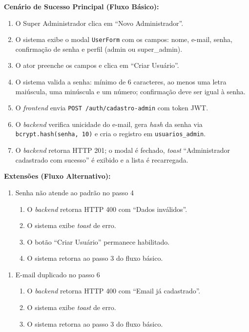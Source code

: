 \textbf{Cenário de Sucesso Principal (Fluxo Básico):}
\begin{enumerate}
  \item O Super Administrador clica em
        ``Novo Administrador''.
  \item O sistema exibe o modal \texttt{UserForm} com
        os campos: nome, e-mail, senha, confirmação de
        senha e perfil (admin ou super\_admin).
  \item O ator preenche os campos e clica em ``Criar Usuário''.
  \item O sistema valida a senha: mínimo de 6 caracteres,
        ao menos uma letra maiúscula, uma minúscula e um
        número; confirmação deve ser igual à senha.
  \item O \textit{frontend} envia
        \texttt{POST /auth/cadastro-admin} com token JWT.
  \item O \textit{backend} verifica unicidade do e-mail,
        gera \textit{hash} da senha via
        \texttt{bcrypt.hash(senha, 10)} e cria o registro
        em \texttt{usuarios\_admin}.
  \item O \textit{backend} retorna HTTP 201; o modal é
        fechado, \textit{toast} ``Administrador cadastrado
        com sucesso'' é exibido e a lista é recarregada.
\end{enumerate}

\textbf{Extensões (Fluxo Alternativo):}

\begin{enumerate}
  \renewcommand{\theenumi}{4a}
  \renewcommand{\labelenumi}{\theenumi.}
  \item Senha não atende ao padrão no passo 4
  \begin{enumerate}
  \item O \textit{backend} retorna HTTP 400 com
        ``Dados inválidos''.
  \item O sistema exibe \textit{toast} de erro.
  \item O botão ``Criar Usuário'' permanece habilitado.
  \item O sistema retorna ao passo 3 do fluxo básico.
  \end{enumerate}
\end{enumerate}

\begin{enumerate}
  \renewcommand{\theenumi}{6a}
  \renewcommand{\labelenumi}{\theenumi.}
  \item E-mail duplicado no passo 6
  \begin{enumerate}
  \item O \textit{backend} retorna HTTP 400 com
        ``Email já cadastrado''.
  \item O sistema exibe \textit{toast} de erro.
  \item O sistema retorna ao passo 3 do fluxo básico.
  \end{enumerate}
\end{enumerate}

